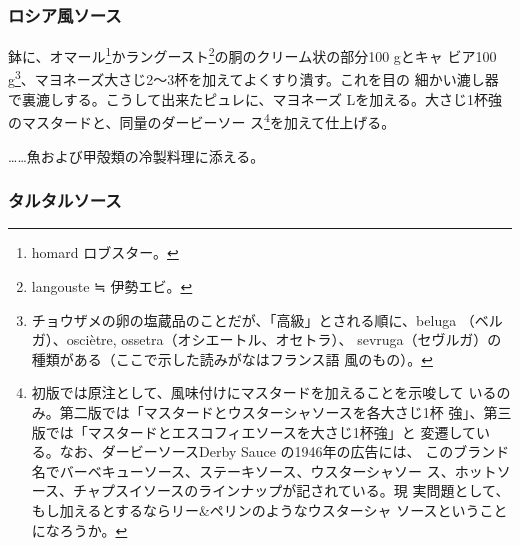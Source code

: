 \begin{recette}
\maeaki

\hypertarget{sauce-russe-froide}{%
\subsubsection{ロシア風ソース}\label{sauce-russe-froide}}



鉢に、オマール\footnote{homard ロブスター。}かラングースト\footnote{langouste
  ≒ 伊勢エビ。}の胴のクリーム状の部分100 gとキャ ビア100 g\footnote{チョウザメの卵の塩蔵品のことだが、「高級」とされる順に、beluga
  （ベルガ）、osciètre, ossetra（オシエートル、オセトラ）、
  sevruga（セヴルガ）の種類がある（ここで示した読みがなはフランス語
  風のもの）。}、マヨネーズ大さじ2〜3杯を加えてよくすり潰す。これを目の
細かい漉し器で裏漉しする。こうして出来たピュレに、マヨネーズ
\troisquarts{} Lを加える。大さじ1杯強のマスタードと、同量のダービーソー
ス\footnote{初版では原注として、風味付けにマスタードを加えることを示唆して
  いるのみ。第二版では「マスタードとウスターシャソースを各大さじ1杯
  強」、第三版では「マスタードとエスコフィエソースを大さじ1杯強」と
  変遷している。なお、ダービーソースDerby Sauce の1946年の広告には、
  このブランド名でバーベキューソース、ステーキソース、ウスターシャソー
  ス、ホットソース、チャプスイソースのラインナップが記されている。現
  実問題として、もし加えるとするならリー\&ペリンのようなウスターシャ
  ソースということになろうか。}を加えて仕上げる。

\ldots{}\ldots{}魚および甲殻類の冷製料理に添える。

\maeaki

\hypertarget{sauce-tartare}{%
\subsubsection{タルタルソース}\label{sauce-tartare}}


\end{recette}
